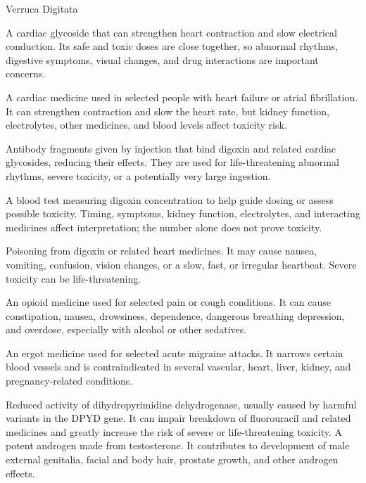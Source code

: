 \synonyms
Verruca Digitata

 A cardiac glycoside that can strengthen heart contraction and slow electrical conduction. Its safe and toxic doses are close together, so abnormal rhythms, digestive symptoms, visual changes, and drug interactions are important concerns.

 A cardiac medicine used in selected people with heart failure or atrial fibrillation. It can strengthen contraction and slow the heart rate, but kidney function, electrolytes, other medicines, and blood levels affect toxicity risk.

 Antibody fragments given by injection that bind digoxin and related cardiac glycosides, reducing their effects. They are used for life-threatening abnormal rhythms, severe toxicity, or a potentially very large ingestion.

 A blood test measuring digoxin concentration to help guide dosing or assess possible toxicity. Timing, symptoms, kidney function, electrolytes, and interacting medicines affect interpretation; the number alone does not prove toxicity.

 Poisoning from digoxin or related heart medicines. It may cause nausea, vomiting, confusion, vision changes, or a slow, fast, or irregular heartbeat. Severe toxicity can be life-threatening.



 An opioid medicine used for selected pain or cough conditions. It can cause constipation, nausea, drowsiness, dependence, dangerous breathing depression, and overdose, especially with alcohol or other sedatives.

 An ergot medicine used for selected acute migraine attacks. It narrows certain blood vessels and is contraindicated in several vascular, heart, liver, kidney, and pregnancy-related conditions.

 Reduced activity of dihydropyrimidine dehydrogenase, usually caused by harmful variants in the DPYD gene. It can impair breakdown of fluorouracil and related medicines and greatly increase the risk of severe or life-threatening toxicity.
 A potent androgen made from testosterone. It contributes to development of male external genitalia, facial and body hair, prostate growth, and other androgen effects.

